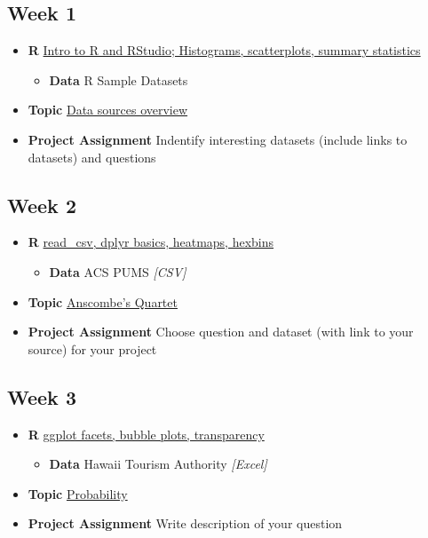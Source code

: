 \documentclass[]{book}
\providecommand{\tightlist}{%
  \setlength{\itemsep}{0pt}\setlength{\parskip}{0pt}}
\theoremstyle{definition}
\theoremstyle{definition}
\theoremstyle{remark}
\begin{document}
\subsection*{Week 1}\label{week-1}

\begin{itemize}
\tightlist
\item
  \textbf{R} \protect\hyperlink{intro}{Intro to R and RStudio;
  Histograms, scatterplots, summary statistics}

  \begin{itemize}
  \tightlist
  \item
    \textbf{Data} R Sample Datasets
  \end{itemize}
\item
  \textbf{Topic} \protect\hyperlink{data-sources}{Data sources overview}
\item
  \textbf{Project Assignment} Indentify interesting datasets (include
  links to datasets) and questions
\end{itemize}

\subsection*{Week 2}\label{week-2}

\begin{itemize}
\tightlist
\item
  \textbf{R} \protect\hyperlink{read-data}{read\_csv, dplyr basics,
  heatmaps, hexbins}

  \begin{itemize}
  \tightlist
  \item
    \textbf{Data} ACS PUMS \emph{{[}CSV{]}}
  \end{itemize}
\item
  \textbf{Topic} \protect\hyperlink{anscombe}{Anscombe's Quartet}
\item
  \textbf{Project Assignment} Choose question and dataset (with link to
  your source) for your project
\end{itemize}

\subsection*{Week 3}\label{week-3}

\begin{itemize}
\tightlist
\item
  \textbf{R} \protect\hyperlink{facets-and-bubbles}{ggplot facets,
  bubble plots, transparency}

  \begin{itemize}
  \tightlist
  \item
    \textbf{Data} Hawaii Tourism Authority \emph{{[}Excel{]}}
  \end{itemize}
\item
  \textbf{Topic} \protect\hyperlink{probability}{Probability}
\item
  \textbf{Project Assignment} Write description of your question
\end{itemize}
\end{document}
